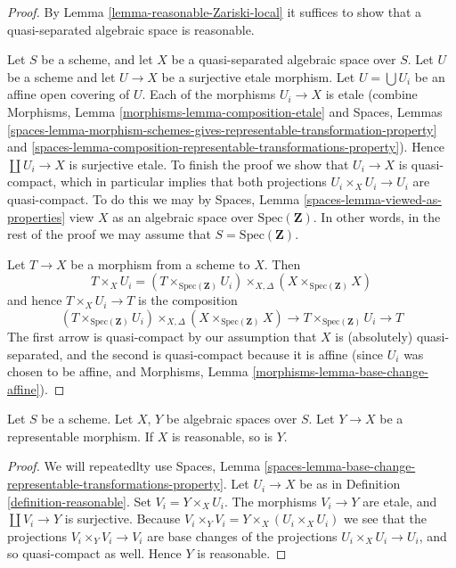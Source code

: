 \begin{proof}
By Lemma \ref{lemma-reasonable-Zariski-local}
it suffices to show that a quasi-separated algebraic space is reasonable.

\medskip\noindent
Let $S$ be a scheme, and let $X$ be a quasi-separated algebraic space
over $S$. Let $U$ be a scheme and let $U \to X$ be a surjective etale
morphism. Let $U = \bigcup U_i$ be an affine open covering of $U$.
Each of the morphisms $U_i \to X$ is etale (combine
Morphisms, Lemma \ref{morphisms-lemma-composition-etale}
and
Spaces, Lemmas
\ref{spaces-lemma-morphism-schemes-gives-representable-transformation-property}
and
\ref{spaces-lemma-composition-representable-transformations-property}).
Hence $\coprod U_i \to X$ is surjective etale.
To finish the proof we show that $U_i \to X$ is quasi-compact, which
in particular implies that both projections $U_i \times_X U_i \to U_i$ are
quasi-compact. To do this we may by
Spaces, Lemma \ref{spaces-lemma-viewed-as-properties}
view $X$ as an algebraic space over $\text{Spec}(\mathbf{Z})$.
In other words, in the rest of the proof we may assume that
$S = \text{Spec}(\mathbf{Z})$.

\medskip\noindent
Let $T \to X$ be a morphism from a scheme to $X$. Then
$$
T \times_X U_i
=
(T \times_{\text{Spec}(\mathbf{Z})} U_i)
\times_{X, \Delta}
(X \times_{\text{Spec}(\mathbf{Z})} X)
$$
and hence $T \times_X U_i \to T$ is the composition
$$
(T \times_{\text{Spec}(\mathbf{Z})} U_i)
\times_{X, \Delta}
(X \times_{\text{Spec}(\mathbf{Z})} X)
\longrightarrow
T \times_{\text{Spec}(\mathbf{Z})} U_i
\longrightarrow T
$$
The first arrow is quasi-compact by our assumption that $X$ is
(absolutely) quasi-separated, and the second is quasi-compact because
it is affine (since $U_i$ was chosen to be affine, and
Morphisms, Lemma \ref{morphisms-lemma-base-change-affine}).
\end{proof}

\begin{lemma}
\label{lemma-representable-reasonable}
Let $S$ be a scheme.
Let $X$, $Y$ be algebraic spaces over $S$.
Let $Y \to X$ be a representable morphism.
If $X$ is reasonable, so is $Y$.
\end{lemma}

\begin{proof}
We will repeatedlty use
Spaces, Lemma
\ref{spaces-lemma-base-change-representable-transformations-property}.
Let $U_i \to X$ be as in Definition \ref{definition-reasonable}.
Set $V_i = Y \times_X U_i$. The morphisms $V_i \to Y$ are etale,
and $\coprod V_i \to Y$ is surjective. Because
$V_i \times_Y V_i = Y \times_X (U_i \times_X U_i)$ we see
that the projections $V_i \times_Y V_i \to V_i$ are
base changes of the projections $U_i \times_X U_i \to U_i$, and so
quasi-compact as well. Hence $Y$ is reasonable.
\end{proof}

